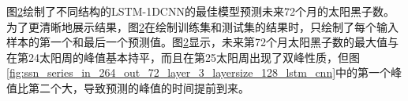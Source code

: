 \begin{figure}[!htbp]
\begin{subfigure}[b]{1.0\textwidth}
    \label{fig:ssn_series_in_264_out_72_layer_5_layersize_256_lstm_cnn}
    \end{subfigure}
  \vspace{-2cm}
  \label{fig:ssn_series_in_264_out_72_lstm_cnn}
\end{figure}

图\ref{fig:ssn_series_in_264_out_72_lstm_cnn}绘制了不同结构的LSTM-1DCNN的最佳模型预测未来72个月的太阳黑子数。为了更清晰地展示结果，图\ref{fig:ssn_series_in_264_out_72_lstm_cnn}在绘制训练集和测试集的结果时，只绘制了每个输入样本的第一个和最后一个预测值。图\ref{fig:ssn_series_in_264_out_72_lstm_cnn}显示，未来第72个月太阳黑子数的最大值与在第24太阳周的峰值基本持平，而且在第25太阳周出现了双峰性质，但图\ref{fig:ssn_series_in_264_out_72_layer_3_layersize_128_lstm_cnn}中的第一个峰值比第二个大，导致预测的峰值的时间提前到来。

